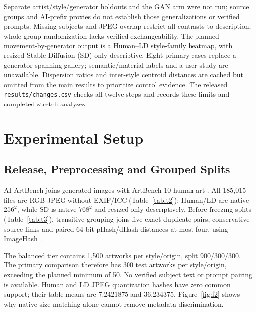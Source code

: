 \documentclass[journal,twoside,web]{IEEEtran}
\begin{document}
Separate artist/style/generator holdouts and the GAN arm were not run; source groups and AI-prefix proxies do not establish those generalizations or verified prompts. Missing subjects and JPEG overlap restrict all contrasts to description; whole-group randomization lacks verified exchangeability. The planned movement-by-generator output is a Human--LD style-family heatmap, with resized Stable Diffusion (SD) only descriptive. Eight primary cases replace a generator-spanning gallery; semantic/material labels and a user study are unavailable. Dispersion ratios and inter-style centroid distances are cached but omitted from the main results to prioritize control evidence. The released \texttt{results/changes.csv} checks all twelve steps and records these limits and completed stretch analyses.

\section{Experimental Setup}
\subsection{Release, Preprocessing and Grouped Splits}
AI-ArtBench joins generated images with ArtBench-10 human art \cite{p1,artbench}. All 185,015 files are RGB JPEG without EXIF/ICC (Table~\ref{tab:t2}); Human/LD are native $256^2$, while SD is native $768^2$ and resized only descriptively. Before freezing splits (Table~\ref{tab:t3}), transitive grouping joins five exact duplicate pairs, conservative source links and paired 64-bit pHash/dHash distances at most four, using ImageHash \cite{imagehash}.



The balanced tier contains 1,500 artworks per style/origin, split 900/300/300. The primary comparison therefore has 300 test artworks per style/origin, exceeding the planned minimum of 50. No verified subject text or prompt pairing is available. Human and LD JPEG quantization hashes have zero common support; their table means are 7.2421875 and 36.234375. Figure~\ref{fig:f2} shows why native-size matching alone cannot remove metadata discrimination.

\end{document}
